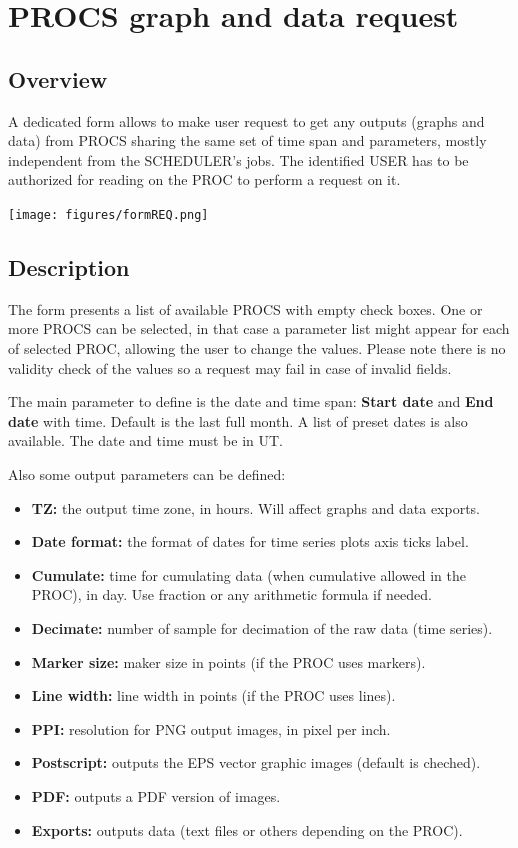 \section{PROCS graph and data request}

\subsection{Overview}

A dedicated form  allows to make user request to get any outputs (graphs and data) from PROCS sharing the same set of time span and parameters, mostly independent from the SCHEDULER's jobs. The identified USER has to be authorized for reading on the PROC to perform a request on it.

\texttt{[image: figures/formREQ.png]}

\subsection{Description}

The form presents a list of available PROCS with empty check boxes. One or more PROCS can be selected, in that case a parameter list might appear for each of selected PROC, allowing the user to change the values. Please note there is no validity check of the values so a request may fail in case of invalid fields.

The main parameter to define is the date and time span: \textbf{Start date} and \textbf{End date} with time. Default is the last full month. A list of preset dates is also available. The date and time must be in UT. 

Also some output parameters can be defined:
\begin{itemize}
\item \textbf{TZ:} the output time zone, in hours. Will affect graphs and data exports.
\item \textbf{Date format:} the format of dates for time series plots axis ticks label.
\item \textbf{Cumulate:} time for cumulating data (when cumulative allowed in the PROC), in day. Use fraction or any arithmetic formula if needed.
\item \textbf{Decimate:} number of sample for decimation of the raw data (time series).
\item \textbf{Marker size:} maker size in points (if the PROC uses markers).
\item \textbf{Line width:} line width in points (if the PROC uses lines).
\item \textbf{PPI:} resolution for PNG output images, in pixel per inch.
\item \textbf{Postscript:} outputs the EPS vector graphic images (default is cheched).
\item \textbf{PDF:} outputs a PDF version of images.
\item \textbf{Exports:} outputs data (text files or others depending on the PROC).
\end{itemize}

